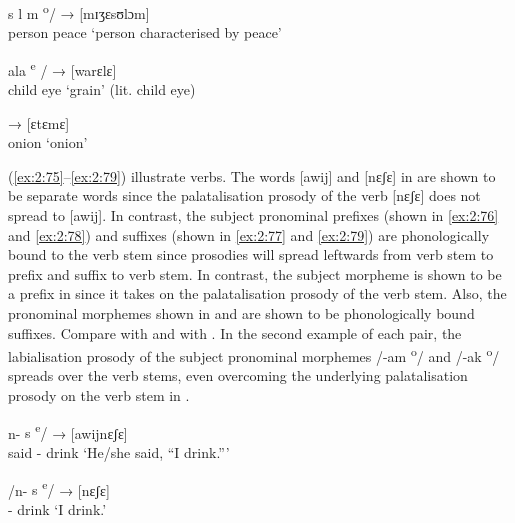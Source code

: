 \ea \label{ex:2:72}
  {s l m \textsuperscript{o}/}   →    [mɪʒɛsʊlɔm]\\
     person                       peace                          {}   {‘person characterised by peace’}\\
\z

\ea \label{ex:2:73}
     {ala \textsuperscript{e }/} \hspace{12pt}  →   [warɛlɛ] \\
    child       eye                    {}      {}  {‘grain’ (lit. child eye)}\\
\z

\ea \label{ex:2:74}
 \hspace{18pt} → [ɛtɛmɛ]\\
     onion                     {}  {} ‘onion’\\
\z

(\ref{ex:2:75}--\ref{ex:2:79}) illustrate verbs. The words [awij] and [nɛʃɛ] in  are shown to be separate words since the palatalisation prosody of the verb [nɛʃɛ] does not spread to [awij]. In contrast, the subject pronominal prefixes (shown in \ref{ex:2:76} and \ref{ex:2:78}) and suffixes (shown in \ref{ex:2:77} and \ref{ex:2:79}) are phonologically bound to the verb stem since prosodies will spread leftwards from verb stem to prefix and suffix to verb stem. In contrast, the subject morpheme is shown to be a prefix in  since it takes on the palatalisation prosody of the verb stem. Also, the pronominal morphemes shown in  and  are shown to be phonologically bound suffixes. Compare  with  and  with . In the second example of each pair, the labialisation prosody of the subject pronominal morphemes /{}-am \textsuperscript{o}/  and /{}-ak \textsuperscript{o}/  spreads over the verb stems, even overcoming the underlying palatalisation prosody on the verb stem in . 

\ea \label{ex:2:75}
                               n-   {s \textsuperscript{e}/} \hspace{9pt} →    [awijnɛʃɛ]\\
     {said}  {\oneS}- drink                  {}  {}   {‘He/she said, “I drink.”’}\\
\z

\ea \label{ex:2:76}
\gll /n-      {s \textsuperscript{e}/} \hspace{32pt} →  [nɛʃɛ]\\
    {\oneS}-  drink                {}    {}  {‘I drink.’}\\
\z

